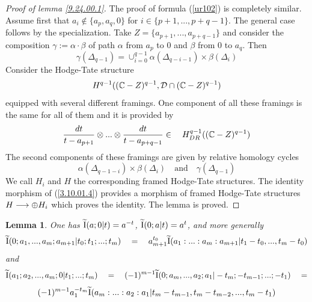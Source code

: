 \documentclass[10pt]{article}
\newtheorem{lemma}[theorem]{Lemma}
\begin{document}
\begin{proof}[Proof of lemma \ref{9.24.00.1}]
The proof of formula (\ref{ur102}) is completely similar. 
Assume first that $a_i \not \in \{ a_p, a_q, 0\}$ for $i \in \{p+1, ..., p+q-1\}$. 
The general case  follows by the specialization. 
Take $Z =\{a_{p+1}, ..., a_{p+q-1}\}$ and consider the composition  $\gamma := 
\alpha \cdot \beta$ of path $\alpha$ from $a_p$ to $0$ and $\beta$ from $0$ to $a_{q}$. Then
$$
\gamma(\Delta_{q-1}) = \cup_{i=0}^{q-1} \alpha(\Delta_{q-i-1}) \times \beta(\Delta_{i})
$$
Consider the Hodge-Tate structure 
\begin{equation}  \label{3.10.01.4}
H^{q-1}(({\mathbb C} - Z)^{q-1}, {\cal D} \cap ({\mathbb C} - Z)^{q-1})
\end{equation}
equipped with several different framings. One component of all these 
framings is the same for all of them and it is provided by 
$$
\frac{dt}{t-a_{p+1}} \otimes ... \otimes \frac{dt}{t-a_{p+q-1}} \in \quad 
H^{q-1}_{DR}(({\mathbb C} - Z)^{q-1})
$$
The second components of these framings are given by relative homology cycles 
$$
\alpha(\Delta_{q-1-i}) \times \beta(\Delta_{i}) \quad \mbox{and} \quad 
\gamma(\Delta_{q-1})
$$
We call $H_i$ and $H$  the corresponding framed Hodge-Tate structures. 
The identity morphism of (\ref{3.10.01.4}) provides a morphism of framed Hodge-Tate 
structures $H \longrightarrow \oplus H_i$ which proves the identity. 
The lemma is proved. 


\end{proof}

\begin{lemma} \label{9.30.00.2} One has 
$
\widetilde {\rm I}(a; 0|t) = a^{-t}$, $ \widetilde {\rm I}(0; a|t) = a^{t}
$, 
and more generally  
\begin{equation}  \label{3.7.01.19}
\widetilde {\rm I}(0; a_1, ..., a_m; a_{m+1}| t_0; t_1; ... ;t_m) \quad = \quad
a_{m+1}^{t_0} \widetilde {\rm I}(a_1: ... : a_m: a_{m+1}| t_1-t_0, ..., t_m-t_0)
\end{equation}
and 
$$
\widetilde {\rm I}(a_1; a_2, ..., a_m; 0| t_1; ...; t_m) \quad = \quad 
(-1)^{m-1}\widetilde {\rm I}(0; a_m, ..., a_2; a_1| -t_m; -t_{m-1}; 
  ...;  - t_1) \quad = 
$$
\begin{equation}  \label{ur8-9}
(-1)^{m-1}a_1^{-t_m} \widetilde {\rm I}(a_m: ... : a_2: a_1| t_m-t_{m-1}, 
 t_m-t_{m-2}, ..., t_m - t_1)
\end{equation}
\end{lemma}
\end{document}
